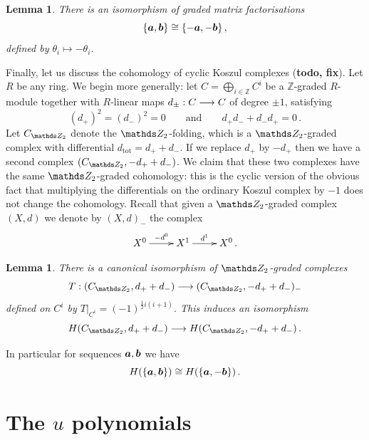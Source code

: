 \documentclass{compositio}
\newtheorem{lemma}[theorem]{Lemma}
\theoremstyle{definition}
\numberwithin{equation}{section}
\begin{document}
\begin{lemma}\label{lemma:cyclickos3} There is an isomorphism of graded matrix factorisations
\[
\{ \boldsymbol{a}, \boldsymbol{b} \} \cong \{ -\boldsymbol{a}, - \boldsymbol{b} \}\,,
\]
defined by $\theta_i \longmapsto - \theta_i$.
\end{lemma}

Finally, let us discuss the cohomology of cyclic Koszul complexes (\textbf{todo, fix}). Let $R$ be any ring. We begin more generally: let $C = \bigoplus_{i \in \mathds{Z}} C^i$ be a $\mathds{Z}$-graded $R$-module together with $R$-linear maps $d_{\pm}: C \longrightarrow C$ of degree $\pm 1$, satisfying
\[
(d_+)^2 = (d_{-})^2 = 0 \qquad \text{and} \qquad d_{+}d_{-} + d_{-}d_{+} = 0 \, .
\]
Let $C_{\Ztwo}$ denote the $\Ztwo$-folding, which is a $\Ztwo$-graded complex with differential $d_{\text{tot}} = d_+ + d_{-}$. If we replace $d_{+}$ by $-d_{+}$ then we have a second complex $(C_{\Ztwo}, -d_{+} + d_{-})$. We claim that these two complexes have the same $\Ztwo$-graded cohomology: this is the cyclic version of the obvious fact that multiplying the differentials on the ordinary Koszul complex by $-1$ does not change the cohomology. Recall that given a $\Ztwo$-graded complex $(X,d)$ we denote by $(X,d)_{-}$ the complex
\[
\xymatrix{%
X^0 \ar[r]^-{-d^0} & X^1 \ar[r]^-{d^1} & X^0\,.
}
\]

\begin{lemma}\label{lemma:cyclickoszulsign} There is a canonical isomorphism of $\Ztwo$-graded complexes
\[
T: (C_{\Ztwo}, d_{+} + d_{-}) \lto (C_{\Ztwo}, -d_{+} + d_{-})_{-}
\]
defined on $C^i$ by $T|_{C^i} = (-1)^{\frac{1}{2}i(i+1)}$. This induces an isomorphism
\[
H(C_{\Ztwo}, d_{+} + d_{-}) \lto H(C_{\Ztwo}, -d_{+} + d_{-}) \, .
\]
\end{lemma}

In particular for sequences $\boldsymbol{a}, \boldsymbol{b}$ we have
\begin{equation}
\label{Habba}
H(\{ \boldsymbol{a}, \boldsymbol{b} \}) \cong H(\{\boldsymbol{a}, -\boldsymbol{b}\}) \, .
\end{equation}

\section{The $u$ polynomials}
\label{appendix:upoly}
\end{document}
